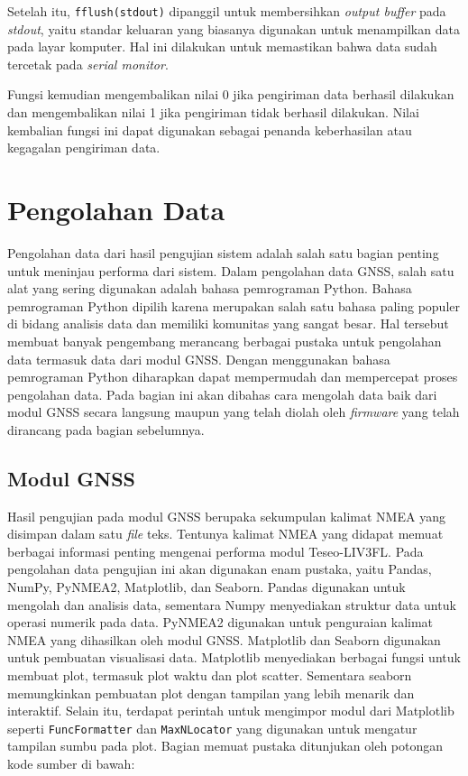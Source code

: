 Setelah itu, \texttt{fflush(stdout)} dipanggil untuk membersihkan \textit{output buffer} pada \textit{stdout}, yaitu standar keluaran yang biasanya digunakan untuk menampilkan data pada layar komputer. Hal ini dilakukan untuk memastikan bahwa data sudah tercetak pada \textit{serial monitor}.

Fungsi kemudian mengembalikan nilai 0 jika pengiriman data berhasil dilakukan dan mengembalikan nilai 1 jika pengiriman tidak berhasil dilakukan. Nilai kembalian fungsi ini dapat digunakan sebagai penanda keberhasilan atau kegagalan pengiriman data.

\section{Pengolahan Data}
Pengolahan data dari hasil pengujian sistem adalah salah satu bagian penting untuk meninjau performa dari sistem. Dalam pengolahan data GNSS, salah satu alat yang sering digunakan adalah bahasa pemrograman Python. Bahasa pemrograman Python dipilih karena merupakan salah satu bahasa paling populer di bidang analisis data dan memiliki komunitas yang sangat besar. Hal tersebut membuat banyak pengembang merancang berbagai pustaka untuk pengolahan data termasuk data dari modul GNSS. Dengan menggunakan bahasa pemrograman Python diharapkan dapat mempermudah dan mempercepat proses pengolahan data. Pada bagian ini akan dibahas cara mengolah data baik dari modul GNSS secara langsung maupun yang telah diolah oleh \textit{firmware} yang telah dirancang pada bagian sebelumnya.

\subsection{Modul GNSS}
Hasil pengujian pada modul GNSS berupaka sekumpulan kalimat NMEA yang disimpan dalam satu \textit{file} teks. Tentunya kalimat NMEA yang didapat memuat berbagai informasi penting mengenai performa modul Teseo-LIV3FL. Pada pengolahan data pengujian ini akan digunakan enam pustaka, yaitu Pandas, NumPy, PyNMEA2, Matplotlib, dan Seaborn. Pandas digunakan untuk mengolah dan analisis data, sementara Numpy menyediakan struktur data untuk operasi numerik pada data. PyNMEA2 digunakan untuk penguraian kalimat NMEA yang dihasilkan oleh modul GNSS. Matplotlib dan Seaborn digunakan untuk pembuatan visualisasi data. Matplotlib menyediakan berbagai fungsi untuk membuat plot, termasuk plot waktu dan plot scatter. Sementara seaborn memungkinkan pembuatan plot dengan tampilan yang lebih menarik dan interaktif. Selain itu, terdapat perintah untuk mengimpor modul dari Matplotlib seperti \texttt{FuncFormatter} dan \texttt{MaxNLocator} yang digunakan untuk mengatur tampilan sumbu pada plot. Bagian memuat pustaka ditunjukan oleh potongan kode sumber di bawah:

